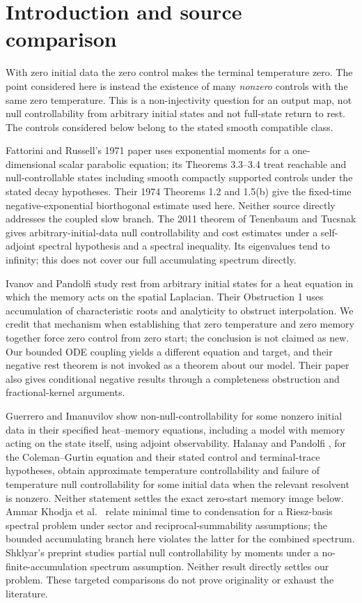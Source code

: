 \section{Introduction and source comparison}\label{sec:intro}
With zero initial data the zero control makes the terminal temperature zero. The point considered here is instead the existence of many \emph{nonzero} controls with the same zero temperature. This is a non-injectivity question for an output map, not null controllability from arbitrary initial states and not full-state return to rest. The controls considered below belong to the stated smooth compatible class.

Fattorini and Russell's 1971 paper \cite{FattoriniRussell1971} uses exponential moments for a one-dimensional scalar parabolic equation; its Theorems 3.3--3.4 treat reachable and null-controllable states including smooth compactly supported controls under the stated decay hypotheses. Their 1974 Theorems 1.2 and 1.5(b) \cite{FattoriniRussell1974} give the fixed-time negative-exponential biorthogonal estimate used here. Neither source directly addresses the coupled slow branch. The 2011 theorem of Tenenbaum and Tucsnak \cite{TenenbaumTucsnak2011} gives arbitrary-initial-data null controllability and cost estimates under a self-adjoint spectral hypothesis and a spectral inequality. Its eigenvalues tend to infinity; this does not cover our full accumulating spectrum directly.

Ivanov and Pandolfi \cite{IvanovPandolfi2009} study rest from arbitrary initial states for a heat equation in which the memory acts on the spatial Laplacian. Their Obstruction 1 uses accumulation of characteristic roots and analyticity to obstruct interpolation. We credit that mechanism when establishing that zero temperature and zero memory together force zero control from zero start; the conclusion is not claimed as new. Our bounded ODE coupling yields a different equation and target, and their negative rest theorem is not invoked as a theorem about our model. Their paper also gives conditional negative results through a completeness obstruction and fractional-kernel arguments.

Guerrero and Imanuvilov \cite{Guerrero2013} show non-null-controllability for some nonzero initial data in their specified heat--memory equations, including a model with memory acting on the state itself, using adjoint observability. Halanay and Pandolfi \cite{HalanayPandolfi2015}, for the Coleman--Gurtin equation and their stated control and terminal-trace hypotheses, obtain approximate temperature controllability and failure of temperature null controllability for some initial data when the relevant resolvent is nonzero. Neither statement settles the exact zero-start memory image below. Ammar Khodja et al.~\cite{Ammar2014} relate minimal time to condensation for a Riesz-basis spectral problem under sector and reciprocal-summability assumptions; the bounded accumulating branch here violates the latter for the combined spectrum. Shklyar's preprint \cite{Shklyar2024} studies partial null controllability by moments under a no-finite-accumulation spectrum assumption. Neither result directly settles our problem. These targeted comparisons do not prove originality or exhaust the literature.

